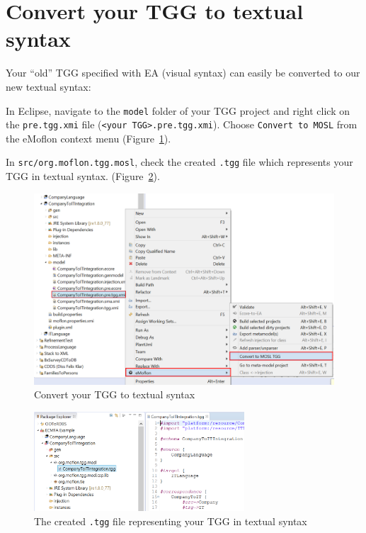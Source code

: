 \newpage

\section{Convert your TGG to textual syntax}
\genHeader

Your ``old'' TGG specified with EA (visual syntax) can easily be
converted to our new textual syntax:

\begin{stepbystep}

\item In Eclipse, navigate to the \texttt{model} folder
of your TGG project and right click on the \texttt{pre.tgg.xmi} file
(\texttt{<your TGG>.pre.tgg.xmi}).
Choose \texttt{Convert to MOSL} from the eMoflon context menu
(Figure~\ref{fig:convertToMOSL}).


\item In \texttt{src/org.moflon.tgg.mosl}, check the
created \texttt{.tgg} file which represents your TGG in textual syntax.
(Figure~\ref{fig:tggfile}).
\end{stepbystep}

\begin{figure}[h]
\begin{center}
 	\includegraphics[width=\textwidth]{../../org.moflon.doc.handbook.05_miscellaneous/10_convertTGGToMOSLTGG/convertToMOSL}
	\caption{Convert your TGG to textual syntax}
  	\label{fig:convertToMOSL}
\end{center}

\end{figure}
\begin{figure}[h]
\begin{center}
 	\includegraphics[width=0.7\textwidth]{../../org.moflon.doc.handbook.05_miscellaneous/10_convertTGGToMOSLTGG/tggfile}
	\caption{The created \texttt{.tgg} file representing your TGG in textual
	syntax}
  	\label{fig:tggfile}
\end{center}
\end{figure}